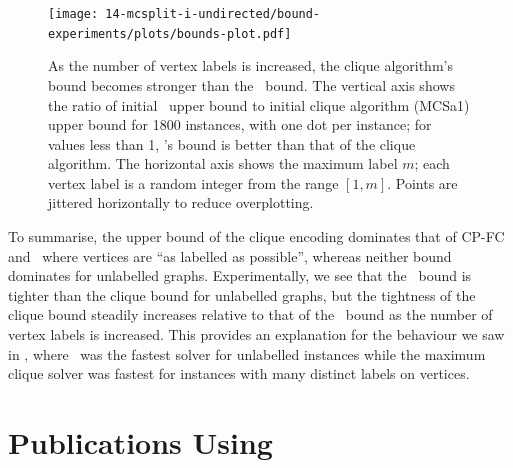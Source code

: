 \begin{figure}[htb]
    \centering
    \texttt{[image: 14-mcsplit-i-undirected/bound-experiments/plots/bounds-plot.pdf]}
    \caption{As the number of vertex labels is increased, the clique algorithm's bound
    	becomes stronger than the \McSplit\ bound.
        The vertical axis shows the ratio of initial \McSplit\ upper bound
	to initial clique algorithm (MCSa1) upper bound for 1800 instances, with one dot per instance;
	for values less than 1, \McSplit's bound is better than that of the clique algorithm.
	The horizontal axis shows the maximum label $m$; each vertex label is a random integer 
	from the range $[1,m]$. Points are jittered horizontally to reduce overplotting.}
    \label{figure:bound-ratio}
\end{figure}

To summarise, the upper bound of the clique encoding
dominates that of CP-FC and \McSplit\ where vertices are ``as labelled as possible'',
whereas neither bound dominates for unlabelled graphs.  Experimentally, we
see that the \McSplit\ bound is tighter than the clique bound for unlabelled
graphs, but the tightness of the clique bound steadily increases
relative to that of the \McSplit\ bound as the number of vertex
labels is increased.
This provides an explanation for the behaviour we saw in
, where \McSplit\ was the fastest solver
for unlabelled instances while the maximum clique solver was fastest for
instances with many distinct labels on vertices.


\section{Publications Using \McSplit}\label{sec:mcsplit-papers}

